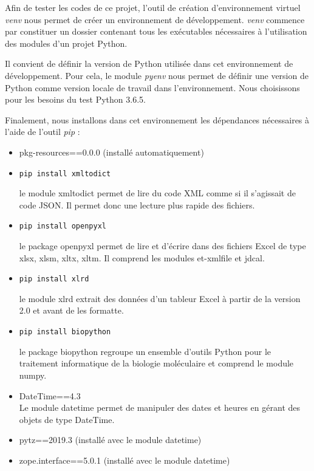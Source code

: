 \documentclass[twoside,a4paper,11pt,frenchb,openany]{report}
\begin{document}
Afin de tester les codes de ce projet, l'outil de création d'environnement virtuel \textit{venv}  nous permet de créer un environnement de développement. \textit{venv} commence par constituer un dossier contenant tous les exécutables nécessaires à l'utilisation des modules d'un projet Python.

Il convient de définir la version de Python utilisée dans cet environnement de développement. Pour cela, le module \textit{pyenv}  nous permet de définir une version de Python comme version locale de travail dans l'environnement. Nous choisissons pour les besoins du test Python 3.6.5.

Finalement, nous installons dans cet environnement les dépendances nécessaires à l'aide de l'outil \textit{pip}  :
\begin{itemize}
\item pkg-resources==0.0.0 (installé automatiquement)
\item \begin{tcolorbox}\texttt{pip install xmltodict}\end{tcolorbox}
le module xmltodict permet de lire du code XML comme si il s'agissait de code JSON. Il permet donc une lecture plus rapide des fichiers.
\item  \begin{tcolorbox}\texttt{pip install openpyxl}\end{tcolorbox}
le package openpyxl permet de lire et d'écrire dans des fichiers Excel de type xlsx, xlsm, xltx, xltm. Il comprend les modules et-xmlfile et jdcal.
\item  \begin{tcolorbox}\texttt{pip install xlrd}\end{tcolorbox}
le module xlrd extrait des données d'un tableur Excel à partir de la version 2.0 et avant de les formatte.
\item  \begin{tcolorbox}\texttt{pip install biopython}\end{tcolorbox}
le package biopython regroupe un ensemble d'outils Python pour le traitement informatique de la biologie moléculaire et comprend le module numpy.
\item DateTime==4.3\\
Le module datetime permet de manipuler des dates et heures en gérant des objets de type DateTime. 
\item pytz==2019.3 (installé avec le module datetime)
\item zope.interface==5.0.1 (installé avec le module datetime)
\end{itemize}
\end{document}
